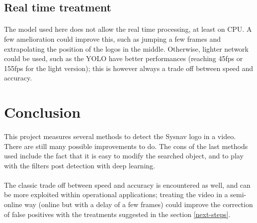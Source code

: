 \documentclass[12pt]{article}%
\begin{document}
\subsection{Real time treatment}
\paragraph{}
The model used here does not allow the real time processing, at least on CPU. A few amelioration could improve this, such as jumping a few frames and extrapolating the position of the logos in the middle. Otherwise, lighter network could be used, such as the YOLO \cite{yolo} have better performances (reaching 45fps or 155fps for the light version); this is however always a trade off between speed and accuracy.

\section{Conclusion}
\paragraph{}
This project measures several methods to detect the Sysnav logo in a video. There are still many possible improvements to do. The cons of the last methods used include the fact that it is easy to modify the searched object, and to play with the filters post detection with deep learning.

\paragraph{}
The classic trade off between speed and accuracy is encountered as well, and can be more exploited within operational applications; treating the video in a semi-online way (online but with a delay of a few frames) could improve the correction of false positives with the treatments suggested in the section \ref{next-steps}.
\end{document}
